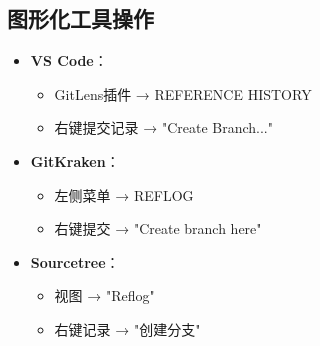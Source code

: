 \subsection{图形化工具操作}
\begin{itemize}[leftmargin=*, nosep]
    \item \textbf{VS Code}：
    \begin{itemize}[leftmargin=*, nosep]
        \item GitLens插件 → REFERENCE HISTORY
        \item 右键提交记录 → "Create Branch..."
    \end{itemize}
    
    \item \textbf{GitKraken}：
    
\begin{itemize}[leftmargin=*, nosep]
        \item 左侧菜单 → REFLOG
        \item 右键提交 → "Create branch here"
    \end{itemize}
    
    \item \textbf{Sourcetree}：
    
\begin{itemize}[leftmargin=*, nosep]
        \item 视图 → "Reflog"
        \item 右键记录 → "创建分支"
    \end{itemize}
\end{itemize}